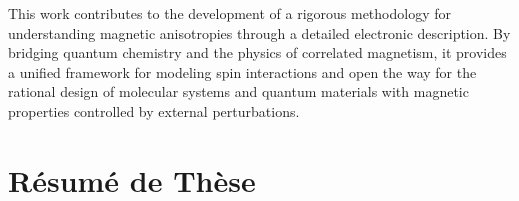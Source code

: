 \documentclass[12pt,a4paper]{report}
\numberwithin{equation}{section}
\begin{document}
This work contributes to the development of a rigorous methodology for understanding magnetic anisotropies through a detailed electronic description. By bridging quantum chemistry and the physics of correlated magnetism, it provides a unified framework for modeling spin interactions and open the way for the rational design of molecular systems and quantum materials with magnetic properties controlled by external perturbations.

\listoffigures
\restoregeometry
\listoftables
\tableofcontents
\newpage
\chapter*{Résumé de Thèse}
\end{document}
